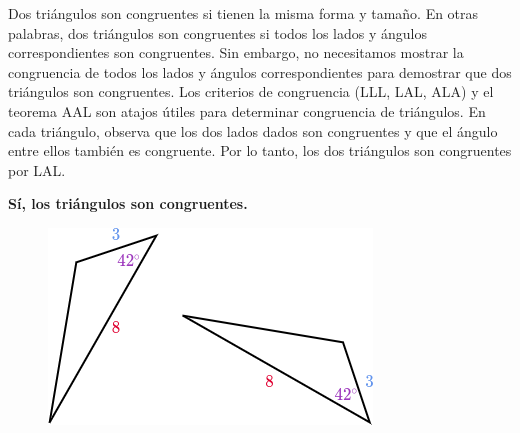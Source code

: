 \begin{solutionbox}{4.5cm}\footnotesize
    \begin{minipage}{0.65\textwidth}
        Dos triángulos son congruentes si tienen la misma forma y tamaño. En otras palabras, dos triángulos son congruentes si todos los lados y ángulos correspondientes son congruentes.
        Sin embargo, no necesitamos mostrar la congruencia de todos los lados y ángulos correspondientes para demostrar que dos triángulos son congruentes. Los criterios de congruencia (LLL, LAL, ALA) y el teorema AAL son atajos útiles para determinar congruencia de triángulos.
        En cada triángulo, observa que los dos lados dados son congruentes y que el ángulo entre ellos también es congruente.
        Por lo tanto, los dos triángulos son congruentes por LAL.

        \textbf{Sí, los triángulos son congruentes.}
    \end{minipage}\hfill
    \begin{minipage}{0.3\textwidth}
        \begin{figure}[H]
            \centering
            \includegraphics[width=0.9\linewidth]{../images/20230323155107}
            \caption{}
            \label{fig:20230323155107}
        \end{figure}
    \end{minipage}

\end{solutionbox}